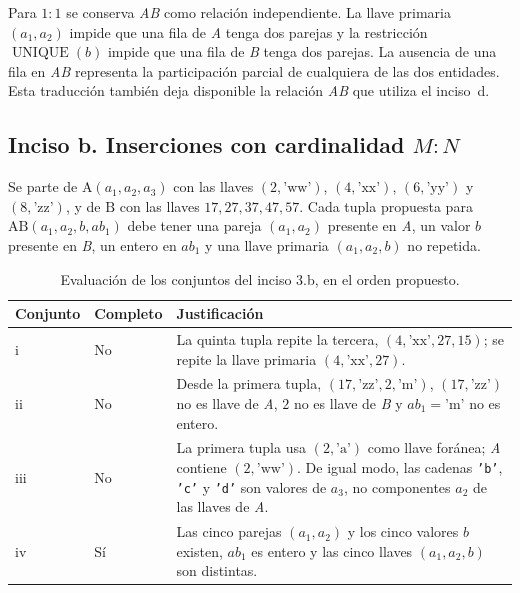 Para $1:1$ se conserva \emph{AB} como relación independiente. La llave
primaria $(a_1,a_2)$ impide que una fila de \emph{A} tenga dos parejas y la
restricción $\operatorname{UNIQUE}(b)$ impide que una fila de \emph{B} tenga
dos parejas. La ausencia de una fila en \emph{AB} representa la participación
parcial de cualquiera de las dos entidades. Esta traducción también deja
disponible la relación \emph{AB} que utiliza el inciso~d.

\subsection{Inciso b. Inserciones con cardinalidad $M:N$}

Se parte de $\mathrm{A}(a_1,a_2,a_3)$ con las llaves
$(2,\text{'ww'})$, $(4,\text{'xx'})$, $(6,\text{'yy'})$ y
$(8,\text{'zz'})$, y de $\mathrm{B}$ con las llaves
$17,27,37,47,57$. Cada tupla propuesta para
$\mathrm{AB}(a_1,a_2,b,ab_1)$ debe tener una pareja $(a_1,a_2)$ presente
en \emph{A}, un valor $b$ presente en \emph{B}, un entero en $ab_1$ y una
llave primaria $(a_1,a_2,b)$ no repetida.

\begin{table}[htbp]
  \centering
  \caption{Evaluación de los conjuntos del inciso 3.b, en el orden propuesto.}
  \label{tab:ej3-b}
  \small
  \begin{tabularx}{\textwidth}{@{}l l >{\raggedright\arraybackslash}X@{}}
    \toprule
    \textbf{Conjunto} & \textbf{Completo} & \textbf{Justificación} \\
    \midrule
    i & No & La quinta tupla repite la tercera,
      $(4,\text{'xx'},27,15)$; se repite la llave primaria
      $(4,\text{'xx'},27)$. \\
    ii & No & Desde la primera tupla, $(17,\text{'zz'},2,\text{'m'})$,
      $(17,\text{'zz'})$ no es llave de \emph{A}, $2$ no es llave de
      \emph{B} y $ab_1=\text{'m'}$ no es entero. \\
    iii & No & La primera tupla usa $(2,\text{'a'})$ como llave foránea;
      \emph{A} contiene $(2,\text{'ww'})$. De igual modo, las cadenas
      \texttt{'b'}, \texttt{'c'} y \texttt{'d'} son valores de $a_3$,
      no componentes $a_2$ de las llaves de \emph{A}. \\
    iv & Sí & Las cinco parejas $(a_1,a_2)$ y los cinco valores $b$
      existen, $ab_1$ es entero y las cinco llaves $(a_1,a_2,b)$
      son distintas. \\
    \bottomrule
  \end{tabularx}
\end{table}

